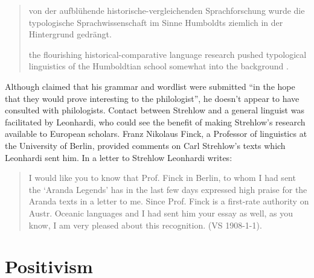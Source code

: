 \documentclass[output=paper]{../langscibook}
\begin{document}
\begin{quote}
    von der aufblühende historische-vergleichenden Sprachforschung wurde die typologische Sprachwissenschaft im Sinne Humboldts ziemlich in der Hintergrund gedrängt. 
    
    the flourishing historical-comparative language research pushed typological linguistics of the Humboldtian school somewhat into the background \citep[216]{deeters_vergleichende_1937}.  
\end{quote}

Although \citet[1]{kempe_grammar_1891} claimed that his grammar and wordlist were submitted ``in the hope that they would prove interesting to the philologist'', he doesn’t appear to have consulted with philologists. Contact between Strehlow and a general linguist was facilitated by Leonhardi, who could see the benefit of making Strehlow’s research available to European scholars. Franz Nikolaus Finck, a Professor of linguistics at the University of Berlin, provided comments on Carl Strehlow’s texts which Leonhardi sent him. In a letter to Strehlow Leonhardi writes: 

\begin{quote}
    I would like you to know that Prof. Finck in Berlin, to whom I had sent the ‘Aranda Legends’ has in the last few days expressed high praise for the Aranda texts in a letter to me. Since Prof. Finck is a first-rate authority on Austr. Oceanic languages and I had sent him your essay as well, as you know, I am very pleased about this recognition.  (VS 1908-1-1).
\end{quote}

\section{Positivism} 
\end{document}
